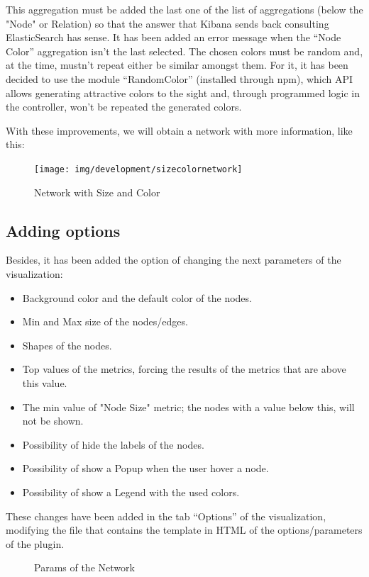 \documentclass[a4paper, 12pt]{book}
\begin{document}
This aggregation must be added the last one of the list of aggregations (below the "Node" or Relation) so that the answer that Kibana sends back consulting ElasticSearch has sense. It has been added an error message when the “Node Color” aggregation isn’t the last selected.
The chosen colors must be random and, at the time, mustn’t repeat either be similar amongst them. For it, it has been decided to use the module “RandomColor” (installed through npm), which API allows generating attractive colors to the sight and, through programmed logic in the controller, won’t be repeated the generated colors.

With these improvements, we will obtain a network with more information, like this:
 
\begin{figure}[H]
  \centering
  \texttt{[image: img/development/sizecolornetwork]}
  \caption{Network with Size and Color}
  \label{fig:sizecolornetwork}
\end{figure}

\subsection{Adding options}

Besides, it has been added the option of changing the next parameters of the visualization:

\begin{itemize}
\item Background color and the default color of the nodes.
\item Min and Max size of the nodes/edges.
\item Shapes of the nodes.
\item Top values of the metrics, forcing the results of the metrics that are above this value.
\item The min value of "Node Size" metric; the nodes with a value below this, will not be shown.
\item Possibility of hide the labels of the nodes.
\item Possibility of show a Popup when the user hover a node.
\item Possibility of show a Legend with the used colors.
\end{itemize}

These changes have been added in the tab “Options” of the visualization, modifying the file that contains the template in HTML of the options/parameters of the plugin.

\begin{figure}[H]
 \centering
 \caption{Params of the Network}
 \label{f:paramsnetwork}
\end{figure}
 
\end{document}
